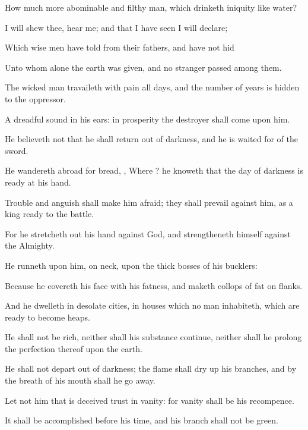 {How much more
abominable and
filthy
{}
man, which
drinketh
iniquity like
water?


\par }{\PP {}I will
shew thee,
hear me; and that
{} I have
seen I will
declare;

Which
wise men have
told from their
fathers, and have not
hid
{}

Unto whom alone the
earth was
given, and no
stranger
passed
among them.

The
wicked man
travaileth with pain all
{}
days, and the
number of
years is
hidden to the
oppressor.

A
dreadful
sound
{} in his
ears: in
prosperity the
destroyer shall
come upon him.

He
believeth not that he shall
return out of
darkness, and he is
waited for of the
sword.

He wandereth
abroad for
bread,
{}, Where
{}? he
knoweth that the
day of
darkness is
ready at his
hand.

Trouble and
anguish shall make him
afraid; they shall
prevail against him, as a
king
ready to the
battle.

For he stretcheth
out his
hand against
God, and
strengtheneth himself against the
Almighty.

He
runneth upon him,
{} on
{}
neck, upon the
thick
bosses of his
bucklers:

Because he
covereth his
face with his
fatness, and
maketh collops of
fat on
{}
flanks.

And he
dwelleth in
desolate
cities,
{} in
houses which no man
inhabiteth, which are
ready to become
heaps.

He shall not be
rich, neither shall his
substance
continue, neither shall he
prolong the
perfection thereof upon the
earth.

He shall not
depart out of
darkness; the
flame shall dry
up his
branches, and by the
breath of his
mouth shall he go
away.

Let not him that is
deceived
trust in
vanity: for
vanity shall be his
recompence.

It shall be
accomplished
before his
time, and his
branch shall not be
green.

}
